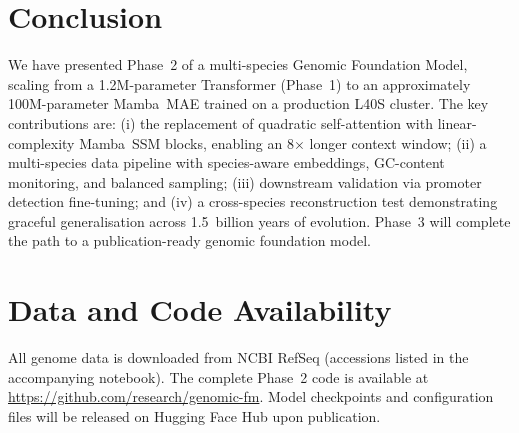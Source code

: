\documentclass[11pt,a4paper,twoside]{article}
\begin{document}
\section{Conclusion}
\label{sec:conclusion}

We have presented Phase~2 of a multi-species Genomic Foundation Model,
scaling from a 1.2M-parameter Transformer (Phase~1) to an approximately
100M-parameter Mamba~MAE trained on a production L40S cluster. The key
contributions are: (i) the replacement of quadratic self-attention with
linear-complexity Mamba~SSM blocks, enabling an 8$\times$ longer context
window; (ii) a multi-species data pipeline with species-aware embeddings,
GC-content monitoring, and balanced sampling; (iii) downstream validation
via promoter detection fine-tuning; and (iv) a cross-species reconstruction
test demonstrating graceful generalisation across 1.5~billion years of
evolution. Phase~3 will complete the path to a publication-ready genomic
foundation model.

\section*{Data and Code Availability}

All genome data is downloaded from NCBI RefSeq (accessions listed in the
accompanying notebook). The complete Phase~2 code is available at
\url{https://github.com/research/genomic-fm}. Model checkpoints and
configuration files will be released on Hugging Face Hub upon publication.
\end{document}
